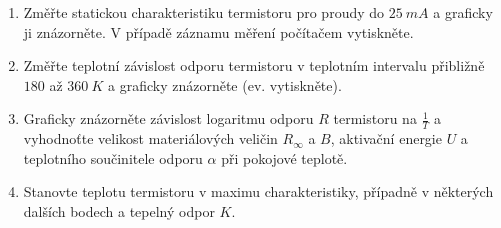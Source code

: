 \documentclass[0-protokol.tex]{subfiles}
\begin{document}
\begin{enumerate}
\item Změřte statickou charakteristiku termistoru pro proudy do $\SI{25}{mA}$ a graficky ji znázorněte. V případě záznamu měření počítačem vytiskněte.
\item Změřte teplotní závislost odporu termistoru v teplotním intervalu přibližně $180$ až $\SI{360}{K}$ a graficky znázorněte (ev. vytiskněte).
\item Graficky znázorněte závislost logaritmu odporu $R$ termistoru na $\frac{1}{T}$ a vyhodnoťte velikost materiálových veličin $R_{\infty}$ a $B$, aktivační energie $U$ a teplotního součinitele odporu $\alpha$ při pokojové teplotě.
\item Stanovte teplotu termistoru v maximu charakteristiky, případně v některých dalších bodech a tepelný odpor $K$.
\end{enumerate}
\end{document}
